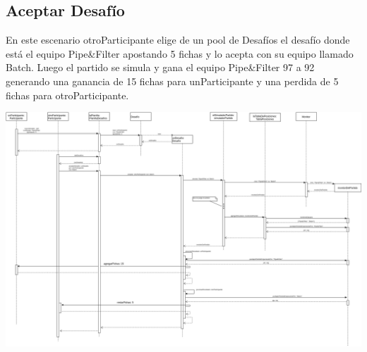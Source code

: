 \subsection{Aceptar Desafío}
En este escenario otroParticipante elige de un pool de Desafíos el desafío donde está el equipo Pipe\&Filter apostando 5 fichas y lo acepta con su equipo llamado Batch. Luego el partido se simula y gana el equipo Pipe\&Filter 97 a 92 generando una ganancia de 15 fichas para unParticipante y una perdida de 5 fichas para otroParticipante. 

\includegraphics[height=0.7\textheight,keepaspectratio, angle =90 ]{imgs/aceptarDesafioSecuencia.png}

